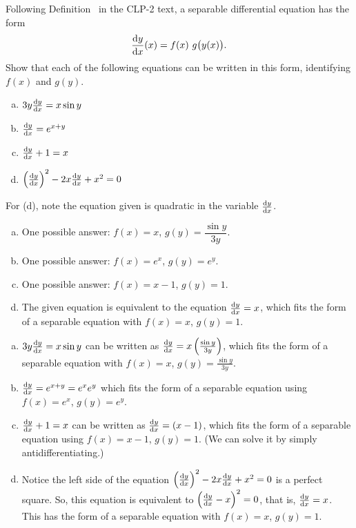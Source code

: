 \begin{Mquestion}
Following Definition~ in the CLP-2 text, a separable differential equation has the form
\[\diff{y}{x}(x) = f(x)\ g\big(y(x)\big).\]
Show that each of the following equations can be written in this form, identifying $f(x)$ and $g(y)$.
\begin{enumerate}[(a)]
\item $3y\diff{y}{x}=x\sin y$
\item $\diff{y}{x} = e^{x+y}$
\item  $\diff{y}{x}+1=x$
\item $\left(\diff{y}{x}\right)^2-2x\diff{y}{x}+x^2=0$
\end{enumerate}
\end{Mquestion}
\begin{hint}
For (d), note the equation given is quadratic in the variable $\diff{y}{x}$.
\end{hint}
\begin{answer}
\begin{enumerate}[(a)]
\item One possible answer: $f(x)=x$, $g(y)=\dfrac{\sin y}{3y}$.
\item One possible answer:  $f(x) = e^x$, $g(y) = e^y$.
\item One possible answer:  $f(x) = x-1$, $g(y) = 1$.
\item The given equation is equivalent to the equation $\diff{y}{x}=x$, which fits the form of a separable equation with $f(x)=x$, $g(y)=1$.
\end{enumerate}
\end{answer}
\begin{solution}
\begin{enumerate}[(a)]
\item $3y\diff{y}{x}=x\sin y$ can be written as $\diff{y}{x} = x\left(\frac{\sin y}{3y}\right)$, which fits the form of a separable equation with $f(x)=x$, $g(y) = \frac{\sin y}{3y}$.
\item $\diff{y}{x} = e^{x+y} = e^xe^y$
which fits the form of a separable equation using $f(x) = e^x$, $g(y) = e^y$.
\item  $\diff{y}{x}+1=x$ can be written as $\diff{y}{x} = (x-1)$, which fits the form of a separable equation using $f(x)=x-1$, $g(y)=1$. (We can solve it by simply antidifferentiating.)
\item Notice the left side of the equation $\left(\diff{y}{x}\right)^2-2x\diff{y}{x}+x^2=0$ is a perfect square. So, this equation is equivalent to $\left(\diff{y}{x}-x\right)^2=0$, that is, $\diff{y}{x}=x$. This has the form of a separable equation with $f(x)=x$, $g(y)=1$.
\end{enumerate}
\end{solution}

